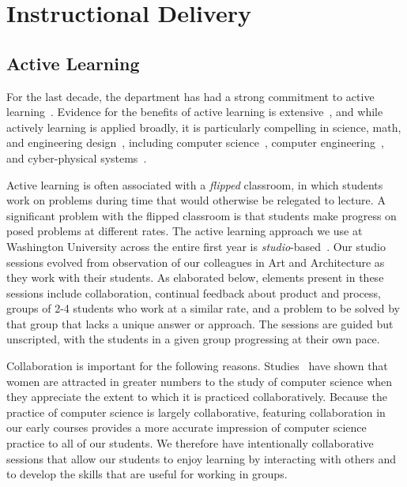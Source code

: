 \section{Instructional Delivery}
\label{sec:delivery}

\subsection{Active Learning}

For the last decade, the department has had a strong commitment to
active learning~\cite{scbggg10,sgcggt10}.
Evidence for the benefits of active learning is
extensive~\cite{Prince04}, %
and while actively learning is applied broadly, it is particularly
compelling in science, math, and engineering
design~\cite{Freeman14},  %
including computer science~\cite{ag13}, %
computer engineering~\cite{sr02}, %
and cyber-physical systems~\cite{me14}. %

Active learning is often associated with a \emph{flipped} classroom, in
which students work on problems during time that would otherwise be
relegated to lecture.  A significant problem with the flipped classroom is
that students make progress on posed problems at different
rates.
The active learning approach we use at Washington University across the entire
first year is \emph{studio}-based~\cite{hnc08}.
Our studio sessions evolved from observation of our colleagues in
Art and Architecture as they work with their students.  As elaborated below,
elements present in
these sessions include collaboration, continual feedback about product
and process, groups of 2-4 students who work at a similar rate, 
and a problem to be solved by that group that lacks a unique
answer or approach.  The sessions are guided but unscripted, with the
students in a given group progressing at their own pace.

Collaboration is important for the following reasons.
Studies~\cite{Krause:2012:EFL:2157136.2157192} have shown that women are
attracted in greater numbers to the study of computer science when they
appreciate the extent to which it is practiced collaboratively.  Because
the practice of computer science is largely collaborative,
featuring collaboration
in our early courses provides a more accurate impression of computer science
practice to all of our students.  We therefore have intentionally collaborative
sessions that allow our students to enjoy learning by interacting with others
and to develop the skills that are useful for working in groups.

